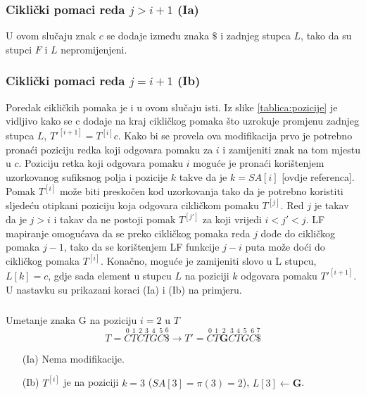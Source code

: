 \documentclass{ferseminar}
\begin{document}
\subsubsection{Ciklički pomaci reda $j>i+1$ (Ia)}
U ovom slučaju znak $c$ se dodaje između znaka $\$$ i zadnjeg stupca $L$, tako da su stupci $F$ i $L$ nepromijenjeni.
\subsubsection{Ciklički pomaci reda $j=i+1$ (Ib)}
Poredak cikličkih pomaka je i u ovom slučaju isti. Iz slike \ref{tablica:pozicije} je vidljivo kako se c dodaje na kraj cikličkog pomaka što uzrokuje promjenu zadnjeg stupca $L$, $T'^{[i+1]}=T^[i]c$. Kako bi se provela ova modifikacija prvo je potrebno pronaći poziciju redka koji odgovara pomaku za $i$ i zamijeniti znak na tom mjestu u $c$. Poziciju retka koji odgovara pomaku  $i$ moguće je pronaći korištenjem uzorkovanog sufiksnog polja i pozicije $k$ takve da je $k=SA[i]$ [ovdje referenca]. Pomak $T^{[i]}$ može biti preskočen kod uzorkovanja tako da je potrebno koristiti sljedeću otipkani poziciju koja odgovara cikličkom pomaku $T^{[j]}$. Red $j$ je takav da je $j>i$ i takav da ne postoji pomak $T^{[j']}$ za koji vrijedi $i<j'<j$. LF mapiranje omogućava da se preko cikličkog pomaka reda $j$ dođe do cikličkog pomaka $j-1$, tako da se korištenjem LF funkcije $j-i$ puta može doći do cikličkog pomaka $T^[i]$. Konačno, moguće je zamijeniti slovo u L stupcu, $L[k]=c$, gdje sada element u stupcu $L$ na poziciji $k$ odgovara pomaku $T'^{[i+1]}$.
U nastavku su prikazani koraci (Ia) i (Ib) na primjeru.
\subparagraph{}
\begin{minipage}{0.5\textwidth}
\footnotesize
Umetanje znaka G na poziciju $i=2$ u $T$
$$
	T=\overset{0}{C}	\overset{1}{T} \overset{2}{C} \overset{3}{T}	\overset{4}{G}
	\overset{5}{C}	\overset{6}{\$} \rightarrow		
	T'=\overset{0}{C}	\overset{1}{T}	\overset{2}{\boldsymbol{G}}  \overset{3}{C} \overset{4}{T}	\overset{5}{G}
	\overset{6}{C}	\overset{7}{\$} 	
$$
\begin{itemize}
  \item[(Ia)] Nema modifikacije.
  \item[(Ib)] $T^{[i]}$ je na poziciji $k=3$ ($SA[3]=\pi(3)=2$), $L[3]\leftarrow \boldsymbol{G}$.
\end{itemize}
\end{minipage} \hfill
\end{document}
